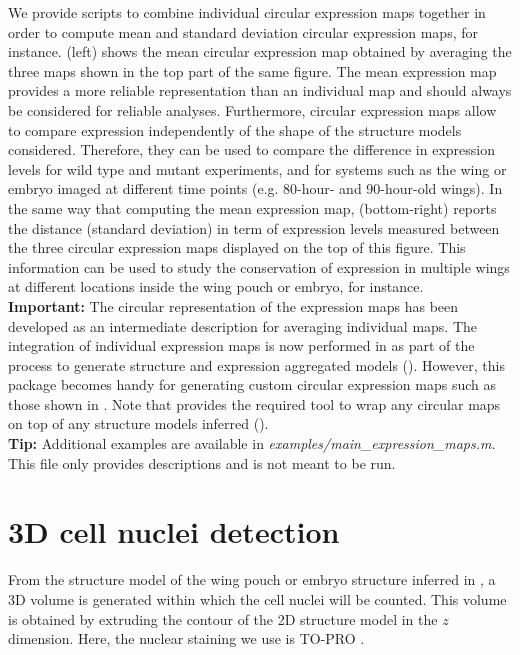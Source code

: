 We provide \matlab scripts to combine individual circular expression maps together in order to compute mean and standard deviation circular expression maps, for instance.  (left) shows the mean circular expression map obtained by averaging the three maps shown in the top part of the same figure. The mean expression map provides a more reliable representation than an individual map and should always be considered for reliable analyses. Furthermore, circular expression maps allow to compare expression independently of the shape of the structure models considered. Therefore, they can be used to compare the difference in expression levels for wild type and mutant experiments, and for systems such as the \droso wing or embryo imaged at different time points (e.g. 80-hour- and 90-hour-old wings). In the same way that computing the mean expression map,  (bottom-right) reports the distance (standard deviation) in term of expression levels measured between the three circular expression maps displayed on the top of this figure. This information can be used to study the conservation of expression in multiple wings at different locations inside the wing pouch or embryo, for instance.\\

\textbf{Important:} The circular representation of the expression maps has been developed as an intermediate description for averaging individual maps. The integration of individual expression maps is now performed in \wingj as part of the process to generate structure and expression aggregated models (). However, this \matlab package becomes handy for generating custom circular expression maps such as those shown in . Note that \wingj provides the required tool to wrap any circular maps on top of any structure models inferred ().\\

\textbf{Tip:} Additional examples are available in \emph{examples/main\_expression\_maps.m}. This file only provides descriptions and is not meant to be run.

\section{3D cell nuclei detection}\label{sec:matlab_nuclei_detection}
From the structure model of the wing pouch or embryo structure inferred in , a 3D volume is generated within which the cell nuclei will be counted. This volume is obtained by extruding the contour of the 2D structure model in the $z$ dimension. Here, the nuclear staining we use is TO-PRO \autocite{schaffter2013}.\\

